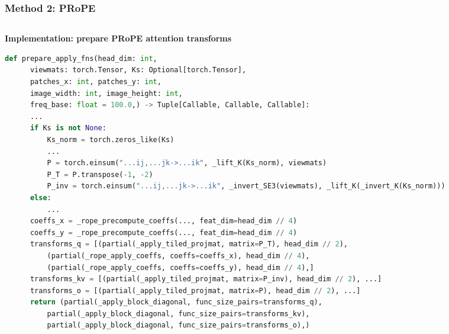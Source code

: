\documentclass[aspectratio=169,11pt]{beamer}
\begin{document}
\begin{frame}[fragile]
  \frametitle{Method 2: PRoPE}

  \vspace{-0.15cm}

  \begin{columns}[T,onlytextwidth]


    \begin{column}{0.52\textwidth}
      {\scriptsize\textbf{Implementation: prepare PRoPE attention transforms}}

      \vspace{0.06cm}

      \begin{lstlisting}[language=Python]
def prepare_apply_fns(head_dim: int,
      viewmats: torch.Tensor, Ks: Optional[torch.Tensor],
      patches_x: int, patches_y: int,
      image_width: int, image_height: int,
      freq_base: float = 100.0,) -> Tuple[Callable, Callable, Callable]:
      ...
      if Ks is not None:
          Ks_norm = torch.zeros_like(Ks)
          ...
          P = torch.einsum("...ij,...jk->...ik", _lift_K(Ks_norm), viewmats)
          P_T = P.transpose(-1, -2)
          P_inv = torch.einsum("...ij,...jk->...ik", _invert_SE3(viewmats), _lift_K(_invert_K(Ks_norm)))
      else:
          ...
      coeffs_x = _rope_precompute_coeffs(..., feat_dim=head_dim // 4)
      coeffs_y = _rope_precompute_coeffs(..., feat_dim=head_dim // 4)
      transforms_q = [(partial(_apply_tiled_projmat, matrix=P_T), head_dim // 2),
          (partial(_rope_apply_coeffs, coeffs=coeffs_x), head_dim // 4),
          (partial(_rope_apply_coeffs, coeffs=coeffs_y), head_dim // 4),]
      transforms_kv = [(partial(_apply_tiled_projmat, matrix=P_inv), head_dim // 2), ...]
      transforms_o = [(partial(_apply_tiled_projmat, matrix=P), head_dim // 2), ...]
      return (partial(_apply_block_diagonal, func_size_pairs=transforms_q),
          partial(_apply_block_diagonal, func_size_pairs=transforms_kv),
          partial(_apply_block_diagonal, func_size_pairs=transforms_o),)
      \end{lstlisting}
    \end{column}

    \hfill


\end{columns}
\end{frame}
\end{document}
